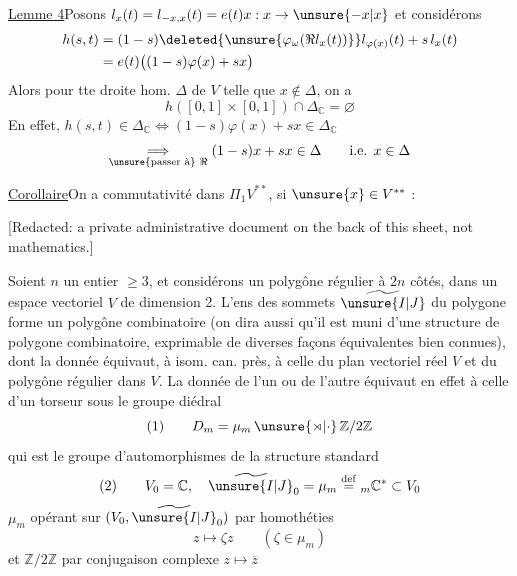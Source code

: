 
\uline{Lemme 4}\quad Posons
$l_x(t)=l_{-x,x}(t)=e(t)x:x\to\unsure{-x|x}$
et considérons
\[
\begin{aligned}
h(s,t)&=(1-s)\deleted{\unsure{\varphi_\omega(\Re l_x(t))}}l_{\varphi(x)}(t)+s\,l_x(t)\\
&=e(t)\bigl((1-s)\varphi(x)+sx\bigr)
\end{aligned}
\]
Alors pour tte droite hom. $\Delta$ de $V$
 telle que $x\notin\Delta$, on a
\[
h([0,1]\times[0,1])\cap\Delta_{\mathbb C}=\varnothing
\]
En effet, $h(s,t)\in\Delta_{\mathbb C}\Longleftrightarrow
(1-s)\varphi(x)+sx\in\Delta_{\mathbb C}$
\[
\underset{\text{\unsure{passer à} }\Re}{\Longrightarrow}
(1-s)x+sx\in\Delta\qquad\text{i.e. }x\in\Delta
\]

\uline{Corollaire}\quad On a commutativité dans
$\Pi_1V^{**}$, si $\unsure{x}\in V^{**}$ :

[Redacted: a private administrative document on the back of this sheet, not mathematics.]

Soient $n$ un entier $\ge3$, et considérons un
polygône régulier à  $2n$ côtés, dans un
espace vectoriel  $V$ de dimension 2.
L'ens des sommets $\widetilde{\unsure{I|J}}$ du polygone forme
un
polygône combinatoire (on dira aussi qu'il est muni d'une structure de polygone
combinatoire, exprimable de diverses façons équivalentes bien connues), dont
la donnée équivaut, à isom. can. près, à celle du plan vectoriel réel $V$
et du polygône régulier dans $V$. La donnée de l'un ou de l'autre
équivaut en effet à celle d'un torseur sous le groupe diédral
\[
(1)\qquad D_m=\mu_m\,\unsure{\rtimes|\cdot}\,\mathbb Z/2\mathbb Z
\]
qui est le groupe d'automorphismes de la structure standard
\[
(2)\qquad V_0=\mathbb C,\quad
\widetilde{\unsure{I|J}}_0=\mu_m\overset{\mathrm{def}}={}_m\mathbb C^*\subset V_0
\]
$\mu_m$ opérant sur $(V_0,\widetilde{\unsure{I|J}}_0)$ par homothéties
\[
z\longmapsto\zeta z\qquad(\zeta\in\mu_m)
\]
et $\mathbb Z/2\mathbb Z$ par conjugaison complexe
$z\longmapsto\overline z$

